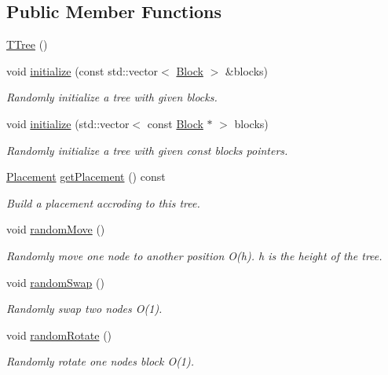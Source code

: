 \subsection*{Public Member Functions}
\begin{DoxyCompactItemize}
\item 
\hyperlink{classTTree_a86fa5aaf9e0e661ab3711fc70c99070e}{T\+Tree} ()
\item 
void \hyperlink{classTTree_a7be152bf003a3b7a41a0d2f2b8a60dcb}{initialize} (const std\+::vector$<$ \hyperlink{structBlock}{Block} $>$ \&blocks)
\begin{DoxyCompactList}\small\item\em Randomly initialize a tree with given blocks. \end{DoxyCompactList}\item 
void \hyperlink{classTTree_a39407b0d5bb0419d5930a264f909d240}{initialize} (std\+::vector$<$ const \hyperlink{structBlock}{Block} $\ast$ $>$ blocks)
\begin{DoxyCompactList}\small\item\em Randomly initialize a tree with given const blocks pointers. \end{DoxyCompactList}\item 
\hyperlink{classPlacement}{Placement} \hyperlink{classTTree_a7e34e70567be7961d4a5683010746aae}{get\+Placement} () const 
\begin{DoxyCompactList}\small\item\em Build a placement accroding to this tree. \end{DoxyCompactList}\item 
void \hyperlink{classTTree_a0b4e068faf77b43c5cb00a4e61a1c130}{random\+Move} ()
\begin{DoxyCompactList}\small\item\em Randomly move one node to another position O(h). h is the height of the tree. \end{DoxyCompactList}\item 
void \hyperlink{classTTree_aa5aab663511558247357bd9031f7f523}{random\+Swap} ()
\begin{DoxyCompactList}\small\item\em Randomly swap two nodes O(1). \end{DoxyCompactList}\item 
void \hyperlink{classTTree_a72310af81f796797a623145656028bfc}{random\+Rotate} ()
\begin{DoxyCompactList}\small\item\em Randomly rotate one node\textquotesingle{}s block O(1). \end{DoxyCompactList}\item 

\end{DoxyCompactItemize}
